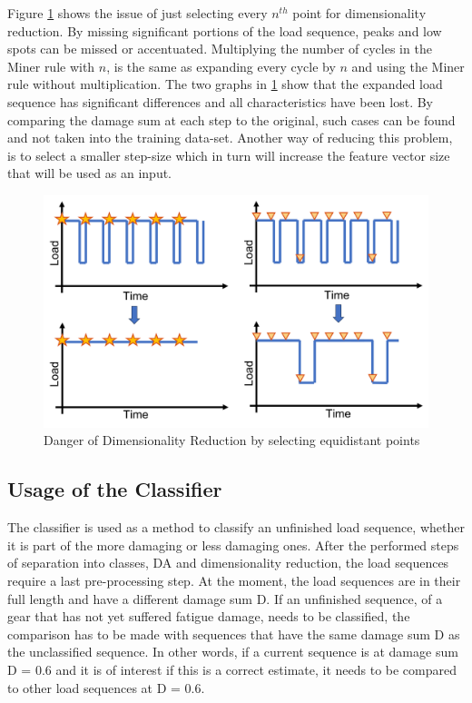 Figure \ref{fig:UL} shows the issue of just selecting every \(n^{th}\) point for dimensionality reduction. By missing significant portions of the load sequence, peaks and low spots can be missed or accentuated. Multiplying the number of cycles in the Miner rule with \(n\), is the same as expanding every cycle by \(n\) and using the Miner rule without multiplication. The two graphs in \ref{fig:UL} show that the expanded load sequence has significant differences and all characteristics have been lost. By comparing the damage sum at each step to the original, such cases can be found and not taken into the training data-set. Another way of reducing this problem, is to select a smaller step-size which in turn will increase the feature vector size that will be used as an input.  

\begin{figure}[H]
	\centering
	\includegraphics[width=0.8\linewidth]{IMGs/Unlucky.png}
	\caption{Danger of Dimensionality Reduction by selecting equidistant points}
	\label{fig:UL}
\end{figure}
 
\subsection{Usage of the Classifier}
The classifier is used as a method to classify an unfinished load sequence, whether it is part of the more damaging or less damaging ones. After the performed steps of separation into classes, DA and dimensionality reduction, the load sequences require a last pre-processing step. At the moment, the load sequences are in their full length and have a different damage sum D.
If an unfinished sequence, of a gear that has not yet suffered fatigue damage, needs to be classified, the comparison has to be made with sequences that have the same damage sum D as the unclassified sequence. In other words, if a current sequence is at damage sum D = 0.6 and it is of interest if this is a correct estimate, it needs to be compared to other load sequences at D = 0.6.
 
